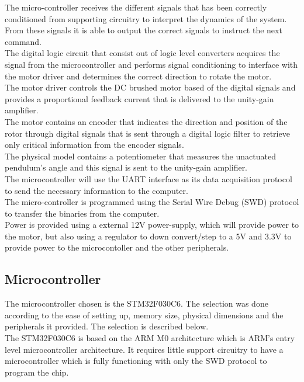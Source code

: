 The micro-controller receives the different signals that has been correctly conditioned from supporting circuitry to interpret the dynamics of the system. From these signals it is able to output the correct signals to instruct the next command.\\

The digital logic circuit that consist out of logic level converters acquires the signal from the microcontroller and performs signal conditioning to interface with the motor driver and determines the correct direction to rotate the motor. \\

The motor driver controls the DC brushed motor based of the digital signals and provides a proportional feedback current that is delivered to the unity-gain amplifier.\\

The motor contains an encoder that indicates the direction and position of the rotor through digital signals that is sent through a digital logic filter to retrieve only critical information from the encoder signals. \\

The physical model contains a potentiometer that measures the unactuated pendulum's angle and this signal is sent to the unity-gain amplifier.\\

The microcontroller will use the UART interface as its data acquisition protocol to send the necessary information to the computer. \\

The micro-controller is programmed using the Serial Wire Debug (SWD) protocol to transfer the binaries from the computer.\\

Power is provided using a external 12V power-supply, which will provide power to the motor, but also using a regulator to down convert/step to a 5V and 3.3V to provide power to the microcontoller and the other peripherals.


\subsection{Microcontroller}
The microcontroller chosen is the STM32F030C6. The selection was done according to the ease of setting up, memory size, physical dimensions and the peripherals it provided. The selection is described below.\\

The STM32F030C6 is based on the ARM M0 architecture which is ARM's entry level microcontroller architecture. It requires little support circuitry to have a microcontroller which is fully  functioning with only the SWD protocol to program the chip.\\

